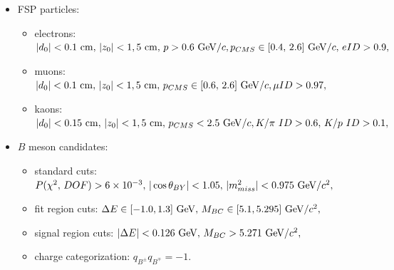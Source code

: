 \begin{itemize}
	\item FSP particles:
	\begin{itemize}
		\item electrons: $\vert d_0 \vert < 0.1\mathrm{~cm},\,\vert z_0 \vert < 1,5\mathrm{~cm},\,p>0.6\mathrm{~GeV}/c,\\p_{CMS}\in[0.4,\,2.6]\mathrm{~GeV}/c,\,eID>0.9,$
		\item muons: $\vert d_0 \vert < 0.1\mathrm{~cm},\,\vert z_0 \vert < 1,5\mathrm{~cm},\,p_{CMS}\in[0.6,\,2.6]\mathrm{~GeV}/c,\\\mu ID>0.97,$
		\item kaons: $\vert d_0 \vert < 0.15\mathrm{~cm},\,\vert z_0 \vert < 1,5\mathrm{~cm},\,p_{CMS} < 2.5\mathrm{~GeV}/c,\\K/\pi~ID>0.6,\,K/p~ID>0.1,$
	\end{itemize}
	\item $B$ meson candidates:
	\begin{itemize}
		\item standard cuts: $P(\chi^2,\,DOF) > 6\times 10^{-3},\,\vert \cos \theta_{BY} \vert < 1.05,\,\vert m_{miss}^2\vert<0.975\mathrm{~GeV}/c^2,$
		\item fit region cuts: $\Delta E \in [-1.0,1.3]\mathrm{~GeV},\,M_{BC} \in [5.1,5.295]\mathrm{~GeV}/c^2,$
		\item signal region cuts: $\vert \Delta E \vert < 0.126\mathrm{~GeV},\,M_{BC} > 5.271\mathrm{~GeV}/c^2,$
		\item charge categorization: $q_{B^\pm}q_{B^\mp} = -1.$
	\end{itemize}
\end{itemize}